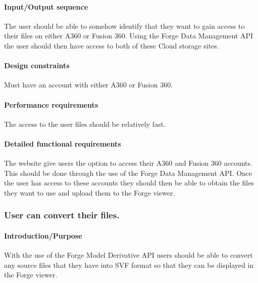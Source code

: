 \documentclass[letterpaper, 10pt, draftclsnofoot, compsoc, onecolumn]{IEEEtran}
\begin{document}
\paragraph[Input/Output sequence]{\rmfamily\bfseries\color{black}
Input/Output sequence }
{\color{black}
	The user should be able to somehow identify that they want to gain access to their files on either A360
	or Fusion 360. Using the Forge Data Management API the user should then have access to both of these
	Cloud storage sites.
}

\paragraph[Design constraints]{\rmfamily\bfseries\color{black} Design
constraints }
{\color{black}
	Must have an account with either A360 or Fusion 360. 
}

\paragraph[Performance requirements]{\rmfamily\bfseries\color{black}
Performance requirements }
{\color{black}
	The access to the user files should be relatively  fast.
}

\paragraph[Detailed functional requirements]{\rmfamily\bfseries\color{black}
Detailed functional requirements }
{\color{black}
	The website give users the option to access their A360 and Fusion 360 accounts. This should be done through
	the use of the Forge Data Management API. Once the user has access to these accounts they should then be 
	able to obtain the files they want to use and upload them to the Forge viewer.
}


\subsubsection[{Model Derivative}]{\rmfamily\bfseries\color{black} \rmfamily\bfseries\color{black}  
	User can convert their files.
}

\paragraph[Introduction/Purpose of this
feature]{\rmfamily\bfseries\color{black}
Introduction/Purpose }
{\color{black}
	With the use of the Forge Model Derivative API users should be able to convert any source files that they have into SVF format
	so that they can be displayed in the Forge viewer.
}
\end{document}
